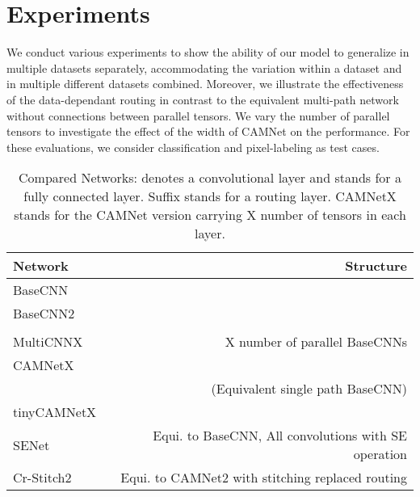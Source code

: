 \documentclass[10pt,twocolumn,letterpaper]{article}
\begin{document}
\section{Experiments}
\label{se:experiments}
\vspace{-0.05in}
We conduct various experiments to show the ability of our model to generalize in multiple datasets separately, accommodating the variation within a dataset and in multiple different datasets combined. Moreover, we illustrate the effectiveness of the data-dependant routing in contrast to the equivalent multi-path network without connections between parallel tensors. We vary the number of parallel tensors to investigate the effect of the width of CAMNet on the performance. For these evaluations, we consider classification and pixel-labeling as test cases.

\begin{table}[ht]
	\caption{Compared Networks:  denotes a convolutional layer and  stands for a fully connected layer. Suffix  stands for a routing layer. CAMNetX stands for the CAMNet version carrying X number of tensors in each layer.}
	\vspace{-0.2in}
	\label{tab:compared_networks}
	\begin{center}
		\renewcommand{\tabcolsep}{0.5mm}
		\begin{tabular}{@{}lr@{}}
			\toprule
			Network & Structure \\
			\midrule
			\small BaseCNN & \footnotesize          \\
			\small BaseCNN2 & \footnotesize         \\& \footnotesize         \\
			\small MultiCNNX & \small X number of parallel BaseCNNs  \\
			\midrule
			\small CAMNetX & \footnotesize          \\& \small (Equivalent single path BaseCNN) \\
			\small tinyCAMNetX & \footnotesize        \\
			\midrule
			\small SENet & \footnotesize Equi. to BaseCNN, All convolutions with SE operation \\
			\small Cr-Stitch2 & \footnotesize Equi. to CAMNet2 with stitching replaced routing  \\
			\bottomrule
		\end{tabular}
	\end{center}
	\vspace{-0.2in}
\end{table}
\end{document}
